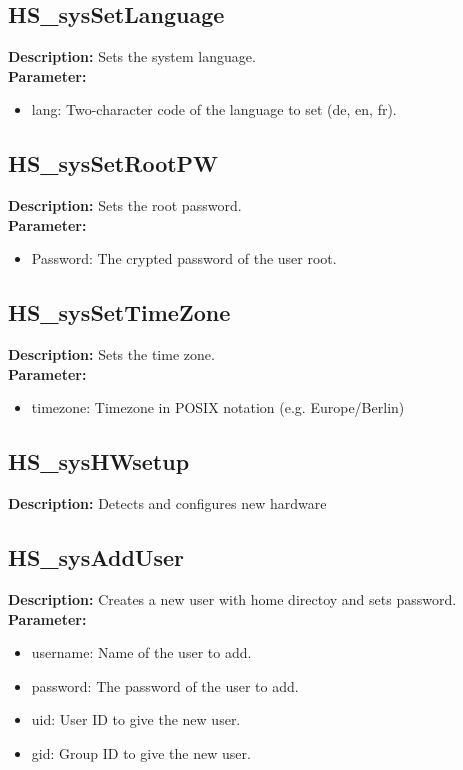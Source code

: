 \subsection{HS\_sysSetLanguage}
\textbf{Description:} Sets the system language.\\
\textbf{Parameter:}
\begin{itemize}
\item lang: Two-character code of the language to set (de, en, fr).
\end{itemize}

\subsection{HS\_sysSetRootPW}
\textbf{Description:} Sets the root password.\\
\textbf{Parameter:}
\begin{itemize}
\item Password: The crypted password of the user root.
\end{itemize}

\subsection{HS\_sysSetTimeZone}
\textbf{Description:} Sets the time zone.\\
\textbf{Parameter:}
\begin{itemize}
\item timezone: Timezone in POSIX notation (e.g. Europe/Berlin)
\end{itemize}

\subsection{HS\_sysHWsetup}
\textbf{Description:} Detects and configures new hardware\\

\subsection{HS\_sysAddUser}
\textbf{Description:} Creates a new user with home directoy and sets password.\\
\textbf{Parameter:}
\begin{itemize}
\item username: Name of the user to add.
\item password: The password of the user to add.
\item uid: User ID to give the new user.
\item gid: Group ID to give the new user.
\end{itemize}

